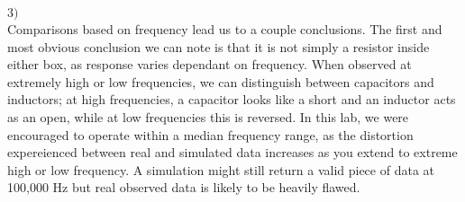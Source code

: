 \documentclass{article}
\begin{document}
\begin{flushleft}
$3)$
\\
Comparisons based on frequency lead us to a couple conclusions. The first and most obvious 
conclusion we can note is that it is not simply a resistor inside either box, as response varies 
dependant on frequency. When observed at extremely high or low frequencies, we can distinguish
between capacitors and inductors; at high frequencies, a capacitor looks like a short and an 
inductor acts as an open, while at low frequencies this is reversed. In this lab, we were 
encouraged to operate within a median frequency range, as the distortion expereienced between 
real and simulated data increases as you extend to extreme high or low frequency. A simulation 
might still return a valid piece of data at 100,000 Hz but real observed data is likely to 
be heavily flawed. 
\end{flushleft}
\end{document}

